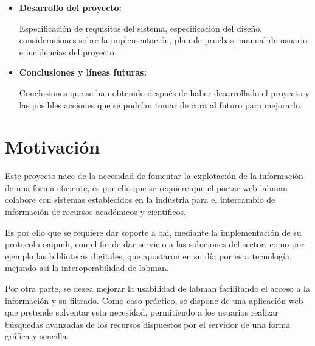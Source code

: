 \begin{itemize}
	\clearpage

	\item \textbf{Desarrollo del proyecto:}
	
	Especificación de requisitos del sistema, especificación del diseño, consideraciones sobre la implementación, plan de pruebas, manual de usuario e incidencias del proyecto.

	\item \textbf{Conclusiones y líneas futuras:}

	Conclusiones que se han obtenido después de haber desarrollado el proyecto y las posibles acciones que se podrían tomar de cara al futuro para mejorarlo.
\end{itemize}

\section{Motivación}

Este proyecto nace de la necesidad de fomentar la explotación de la información de una forma eficiente, es por ello que se requiere que el portar web \acrshort{labman} colabore con sistemas establecidos en la industria para el intercambio de información de recursos académicos y científicos.

Es por ello que se requiere dar soporte a \acrshort{oai}, mediante la implementación de su protocolo \acrshort{oaipmh}, con el fin de dar servicio a las soluciones del sector, como por ejemplo las bibliotecas digitales, que apostaron en su día por esta tecnología, mejando así la interoperabilidad de \acrshort{labman}.

Por otra parte, se desea mejorar la usabilidad de \acrshort{labman} facilitando el acceso a la información y su filtrado. Como caso práctico, se dispone de una aplicación web que pretende solventar esta necesidad, permitiendo a los usuarios realizar búsquedas avanzadas de los recursos dispuestos por el servidor de una forma gráfica y sencilla.





